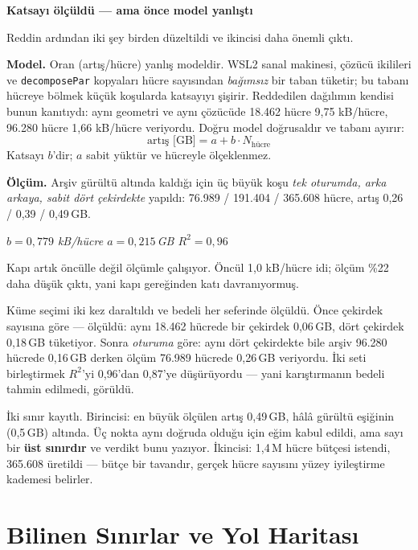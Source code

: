 \documentclass[11pt,a4paper]{article}
\newcommand{\kkkenar}{lacivert}
\newcommand{\kkzemin}{kod}
\newenvironment{renkkutu}[3]{%
  \renewcommand{\kkkenar}{#1}\renewcommand{\kkzemin}{#2}%
  \par\medskip\noindent
  \begin{lrbox}{\kutugovde}%
  \begin{minipage}{\dimexpr\linewidth-2\fboxsep-2\fboxrule\relax}\footnotesize
  \textcolor{#1}{\textbf{#3}}\par\vspace{3pt}%
}{%
  \end{minipage}%
  \end{lrbox}%
  \noindent\fcolorbox{\kkkenar}{\kkzemin}{\usebox{\kutugovde}}%
  \par\medskip
}
\newenvironment{olculdu}[1]{\begin{renkkutu}{iyi}{iyibg}{#1}}{\end{renkkutu}}
\begin{document}
\begin{olculdu}{Katsayı ölçüldü --- ama önce model yanlıştı}
Reddin ardından iki şey birden düzeltildi ve ikincisi daha önemli çıktı.

\textbf{Model.} Oran (artış/hücre) yanlış modeldir. WSL2 sanal makinesi,
çözücü ikilileri ve \texttt{decomposePar} kopyaları hücre sayısından
\emph{bağımsız} bir taban tüketir; bu tabanı hücreye bölmek küçük koşularda
katsayıyı şişirir. Reddedilen dağılımın kendisi bunun kanıtıydı: aynı geometri
ve aynı çözücüde 18.462 hücre 9{,}75 kB/hücre, 96.280 hücre 1{,}66 kB/hücre
veriyordu. Doğru model doğrusaldır ve tabanı ayırır:
\[ \text{artış [GB]} = a + b\cdot N_{\text{hücre}} \]
Katsayı $b$'dir; $a$ sabit yüktür ve hücreyle ölçeklenmez.

\textbf{Ölçüm.} Arşiv gürültü altında kaldığı için üç büyük koşu \emph{tek
oturumda, arka arkaya, sabit dört çekirdekte} yapıldı: 76.989 / 191.404 /
365.608 hücre, artış 0{,}26 / 0{,}39 / 0{,}49\,GB.

\begin{center}\itshape
$b = 0{,}779$ kB/hücre \quad $a = 0{,}215$\,GB \quad $R^2 = 0{,}96$
\end{center}

\noindent Kapı artık öncülle değil ölçümle çalışıyor. Öncül 1{,}0 kB/hücre
idi; ölçüm \%22 daha düşük çıktı, yani kapı gereğinden katı davranıyormuş.

Küme seçimi iki kez daraltıldı ve bedeli her seferinde ölçüldü. Önce çekirdek
sayısına göre --- ölçüldü: aynı 18.462 hücrede bir çekirdek 0{,}06\,GB, dört
çekirdek 0{,}18\,GB tüketiyor. Sonra \emph{oturuma} göre: aynı dört çekirdekte
bile arşiv 96.280 hücrede 0{,}16\,GB derken ölçüm 76.989 hücrede 0{,}26\,GB
veriyordu. İki seti birleştirmek $R^2$'yi 0{,}96'dan 0{,}87'ye düşürüyordu ---
yani karıştırmanın bedeli tahmin edilmedi, görüldü.

İki sınır kayıtlı. Birincisi: en büyük ölçülen artış 0{,}49\,GB, hâlâ gürültü
eşiğinin (0{,}5\,GB) altında. Üç nokta aynı doğruda olduğu için eğim kabul
edildi, ama sayı bir \textbf{üst sınırdır} ve verdikt bunu yazıyor. İkincisi:
1{,}4\,M hücre bütçesi istendi, 365.608 üretildi --- bütçe bir tavandır,
gerçek hücre sayısını yüzey iyileştirme kademesi belirler.
\end{olculdu}

\section{Bilinen Sınırlar ve Yol Haritası}
\end{document}
